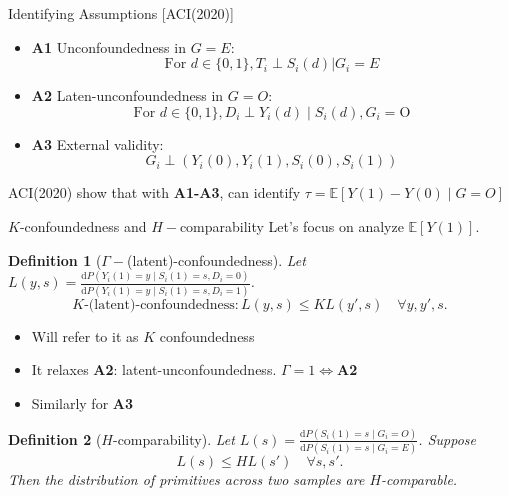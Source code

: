 \documentclass{beamer}					%
\newtheorem{defn}{Definition}
\newcommand{\Ep}{\mathbb{E}}
\begin{document}
\begin{frame}{Identifying Assumptions [ACI(2020)]}
    \begin{itemize}
        \item {\color{green}\textbf{A1}} Unconfoundedness in $G=E$:
        $$\text{For }d \in\{0,1\}, T_i \perp S_i(d) | G_i = E$$

        \item {\color{red}\textbf{A2}} Laten-unconfoundedness in $G=O$:
		$$
		\text{For }d \in\{0,1\}, D_{i} \perp Y_{i}(d) \mid S_i(d), G_{i}=\mathrm{O}
		$$
		
		\item {\color{red}\textbf{A3}} External validity: $$G_{i} \perp\left(Y_{i}(0), Y_{i}(1), S_{i}(0), S_{i}(1)\right)$$
    \end{itemize}
    \begin{center}
        ACI(2020) show that with \textbf{A1-A3}, can identify $\tau = \Ep[Y(1) - Y(0) \mid G = O]$
    \end{center}
\end{frame}


\begin{frame}{$K$-confoundedness  and $H-$comparability}
Let's focus on analyze $\Ep[Y(1)]$.
\begin{defn}[$\Gamma-$(latent)-confoundedness] Let $L(y,s) = \frac{\mathrm{d} P(Y_i(1) = y \mid S_i(1) = s, D_i =0)}{\mathrm{d} P(Y_i(1) = y \mid S_i(1) = s, D_i = 1)}$.  $$K\text{-(latent)-confoundedness}: L(y,s) \leq K L(y',s) \quad \forall y,y',s.$$
	\end{defn}
\begin{itemize}
    \item Will refer to it as $K$ confoundedness
	\item It relaxes {\color{red}\textbf{A2}}: latent-unconfoundedness. $\Gamma = 1\iff ${\color{red}\textbf{A2}} 
	\item Similarly for {\color{red}\textbf{A3}}
\end{itemize}
	\begin{defn}[$H$-comparability]
	 Let $L(s) = \frac{\mathrm{d} P(S_i(1) = s \mid G_i = O)}{\mathrm{d} P(S_i(1) = s \mid G_i = E)}$. Suppose $$L(s) \leq H L(s') \quad \forall s,s'.$$ Then the distribution of primitives across two samples are $H$-comparable.
	\end{defn}
\end{frame}
\end{document}
